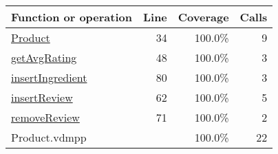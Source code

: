 \bigskip
\begin{longtable}{|l|r|r|r|}
\hline
Function or operation & Line & Coverage & Calls \\
\hline
\hline
\hyperref[Product:34]{Product} & 34&100.0\% & 9 \\
\hline
\hyperref[getAvgRating:48]{getAvgRating} & 48&100.0\% & 3 \\
\hline
\hyperref[insertIngredient:80]{insertIngredient} & 80&100.0\% & 3 \\
\hline
\hyperref[insertReview:62]{insertReview} & 62&100.0\% & 5 \\
\hline
\hyperref[removeReview:71]{removeReview} & 71&100.0\% & 2 \\
\hline
\hline
Product.vdmpp & & 100.0\% & 22 \\
\hline
\end{longtable}

